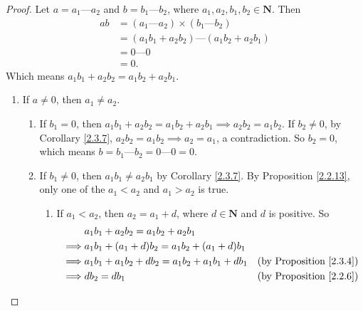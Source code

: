 \begin{proof}
    Let \(a = a_1 \text{---} a_2\) and \(b = b_1 \text{---} b_2\), where \(a_1, a_2, b_1, b_2 \in \mathbf{N}\).
    Then
    \begin{align*}
        ab & = (a_1 \text{---} a_2) \times (b_1 \text{---} b_2) \\
           & = (a_1b_1 + a_2b_2) \text{---} (a_1b_2 + a_2b_1)   \\
           & = 0 \text{---} 0                                   \\
           & = 0.
    \end{align*}
    Which means \(a_1b_1 + a_2b_2 = a_1b_2 + a_2b_1\).
    \begin{enumerate}
        \item If \(a \neq 0\), then \(a_1 \neq a_2\).
              \begin{enumerate}[label=(\roman*)]
                  \item If \(b_1 = 0\), then \(a_1b_1 + a_2b_2 = a_1b_2 + a_2b_1 \implies a_2b_2 = a_1b_2\).
                        If \(b_2 \neq 0\), by Corollary \ref{2.3.7}, \(a_2b_2 = a_1b_2 \implies a_2 = a_1\), a contradiction.
                        So \(b_2 = 0\), which means \(b = b_1 \text{---} b_2 = 0 \text{---} 0 = 0\).
                  \item If \(b_1 \neq 0\), then \(a_1b_1 \neq a_2b_1\) by Corollary \ref{2.3.7}.
                        By Proposition \ref{2.2.13}, only one of the \(a_1 < a_2\) and \(a_1 > a_2\) is true.
                        \begin{enumerate}[label=(\arabic*)]
                            \item If \(a_1 < a_2\), then \(a_2 = a_1 + d\), where \(d \in \mathbf{N}\) and \(d\) is positive.
                                  So
                                  \begin{align*}
                                               & a_1b_1 + a_2b_2 = a_1b_2 + a_2b_1                                                     \\
                                      \implies & a_1b_1 + (a_1 + d)b_2 = a_1b_2 + (a_1 + d)b_1                                         \\
                                      \implies & a_1b_1 + a_1b_2 + db_2 = a_1b_2 + a_1b_1 + db_1 & \text{(by Proposition \ref{2.3.4})} \\
                                      \implies & db_2 = db_1                                     & \text{(by Proposition \ref{2.2.6})} \\

\end{align*}
\end{enumerate}
\end{enumerate}
\end{enumerate}
\end{proof}
